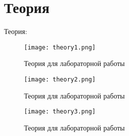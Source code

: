 \chapter{Теория}
\label{ch:intro}

Теория:\\

\begin{figure}[H]
    \centering
    \texttt{[image: theory1.png]}
    \caption{Теория для лабораторной работы}
\end{figure}

\begin{figure}[H]
    \centering
    \texttt{[image: theory2.png]}
    \caption{Теория для лабораторной работы}
\end{figure}

\begin{figure}[H]
    \centering
    \texttt{[image: theory3.png]}
    \caption{Теория для лабораторной работы}
\end{figure}


\endinput